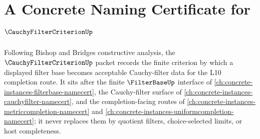 \chapter{A Concrete Naming Certificate for $\CauchyFilterCriterionUp$}
\label{ch:concrete-instances-cauchy-filter-criterion-namecert}

Following Bishop and Bridges constructive analysis, the $\CauchyFilterCriterionUp$ packet records the finite criterion by which a displayed filter base becomes acceptable Cauchy-filter data for the L10 completion route. It sits after the finite $\FilterBaseUp$ interface of \autoref{ch:concrete-instances-filterbase-namecert}, the Cauchy-filter surface of \autoref{ch:concrete-instances-cauchyfilter-namecert}, and the completion-facing routes of \autoref{ch:concrete-instances-metriccompletion-namecert} and \autoref{ch:concrete-instances-uniformcompletion-namecert}; it never replaces them by quotient filters, choice-selected limits, or host completeness.

